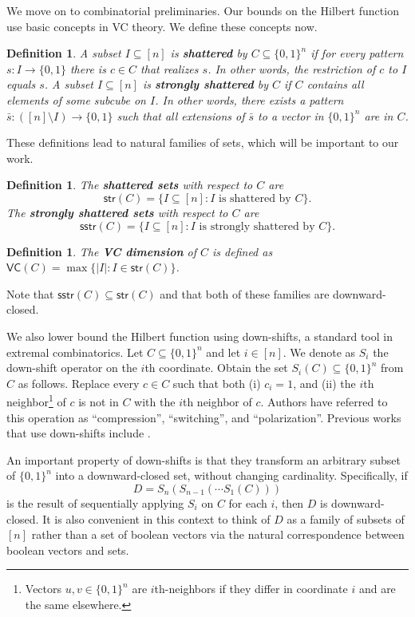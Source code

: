 \documentclass[11pt]{article}
\newtheorem{definition}[theorem]{Definition}
\theoremstyle{definition}
\newcommand{\1}{\mathbf{1}}
\newcommand{\sstr}{\mathsf{sstr}}
\newcommand{\str}{\mathsf{str}}
\newcommand{\vc}{\mathsf{VC}}
\newcommand{\setof}[1]{#1}
\begin{document}
We move on to combinatorial preliminaries.  Our bounds on the Hilbert function use basic concepts in VC theory.  We define these concepts now.  

\begin{definition} A subset $I\subseteq [n]$ is {\bf shattered} by $C \subseteq \{0,1\}^n$ if for every pattern $s:I\rightarrow\{0,1\}$ there is $c\in C$ that realizes $s$. In other words, the restriction of $c$ to $I$ equals $s$. 
A subset $I\subseteq [n]$ is {\bf strongly shattered} by $C$ if $C$ contains all elements of some subcube on $I$. In other words, there exists a pattern $\bar s:([n] \setminus I)\rightarrow\{0,1\}$ such that all extensions of $\bar s$ to a vector
in $\{0,1\}^{n}$ are in $C$. 
\end{definition}
\noindent
These definitions lead to natural families of sets, which will be important to our work. 

\begin{definition}
The {\bf shattered sets} with respect to $C$ are 
\[ \str(C) = \{I\subseteq [n]:I\mbox{ is shattered by }C\}.\]
The {\bf strongly shattered sets} with respect to $C$ are  
\[ \sstr(C) = \{I\subseteq [n]:I\mbox{ is strongly shattered by }C\}.\]
\end{definition}

\begin{definition}
The {\bf VC dimension} of $C$ is defined as $ \vc(C) = \max \{|I| : I \in \str(C) \}$.
\end{definition}
\noindent
Note that $\sstr(C)\subseteq\str(C)$ and that both of these families are downward-closed. 

We also lower bound the Hilbert function using down-shifts, a  standard tool in extremal combinatorics.   
Let $C\subseteq\{0,1\}^n$ and let $i\in [n]$. We denote as $S_i$ the down-shift operator
on the $i$th coordinate.  Obtain the set 
$S_i(C)\subseteq\{0,1\}^n$ from $C$ as follows.  Replace every $c\in C$ such that both (i) $c_i=1$, and (ii) the $i$th neighbor\footnote{Vectors $u,v\in\{0,1\}^n$ are {$i$th-neighbors} if they differ in coordinate $i$ and are the same elsewhere.} of $c$ is not in $C$ with the $i$th neighbor of $c$.    Authors have referred to this operation as ``compression'', ``switching'', and ``polarization''. Previous works that use down-shifts include  \cite{Kleitman1966,Enflo70,BollobasL96,GoldreichGLRS00,GreenT09,moran_thesis}.

An important property of down-shifts is that they transform an arbitrary subset of $\{0,1\}^n$ into a downward-closed set, without changing cardinality. Specifically, if \[D=S_{n}(S_{n-1}(\cdots S_1(C)))\] is the result of sequentially applying $S_i$ on $C$ for each $i$, then $\setof{D}$ is downward-closed.  It is also convenient in this context to think of $D$ as a family of subsets of $[n]$ rather than a set of boolean vectors via the natural correspondence between boolean vectors and sets.  
\end{document}
